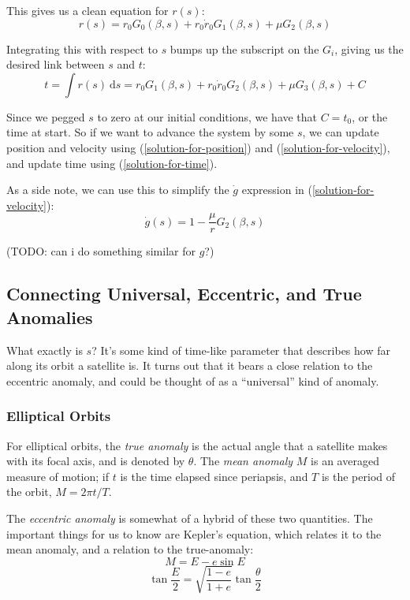 \documentclass{article}
\newcommand{\dd}{\mathrm{d}}
\numberwithin{equation}{subsection}
\begin{document}
This gives us a clean equation for $r(s)$:
\begin{equation}
r(s) = r_0 G_0(\beta, s) + r_0 \dot{r}_0 G_1(\beta, s) + \mu G_2(\beta, s)
\end{equation}

Integrating this with respect to $s$ bumps up the subscript on the $G_i$, giving us the desired link between $s$ and $t$:
\begin{equation}
\label{solution-for-time}
t = \int r(s)~\dd s = r_0 G_1(\beta, s) + r_0 \dot{r}_0 G_2(\beta, s) + \mu G_3(\beta, s) + C
\end{equation}

Since we pegged $s$ to zero at our initial conditions, we have that $C = t_0$, or the time at start. So if we want to advance the system by some $s$, we can update position and velocity using (\ref{solution-for-position}) and (\ref{solution-for-velocity}), and update time using (\ref{solution-for-time}).

As a side note, we can use this to simplify the $\dot g$ expression in (\ref{solution-for-velocity}):
\begin{equation}
\dot g(s) = 1 - \frac{\mu}{r} G_2(\beta, s)
\end{equation}

(TODO: can i do something similar for $g$?)

\subsection{Connecting Universal, Eccentric, and True Anomalies}

What exactly is $s$? It's some kind of time-like parameter that describes how far along its orbit a satellite is. It turns out that it bears a close relation to the eccentric anomaly, and could be thought of as a ``universal'' kind of anomaly.

\subsubsection*{Elliptical Orbits}

For elliptical orbits, the \emph{true anomaly} is the actual angle that a satellite makes with its focal axis, and is denoted by $\theta$. The \emph{mean anomaly} $M$ is an averaged measure of motion; if $t$ is the time elapsed since periapsis, and $T$ is the period of the orbit, $M = 2 \pi t / T$.

The \emph{eccentric anomaly} is somewhat of a hybrid of these two quantities. The important things for us to know are Kepler's equation, which relates it to the mean anomaly, and a relation to the true-anomaly:
\begin{equation}
\label{keplers-equation}
M = E - e \sin E
\end{equation}
\begin{equation}
\label{eccentric-anomaly}
\tan{\frac{E}{2}} = \sqrt{\frac{1-e}{1+e}} \tan{\frac{\theta}{2}}
\end{equation}
\end{document}
